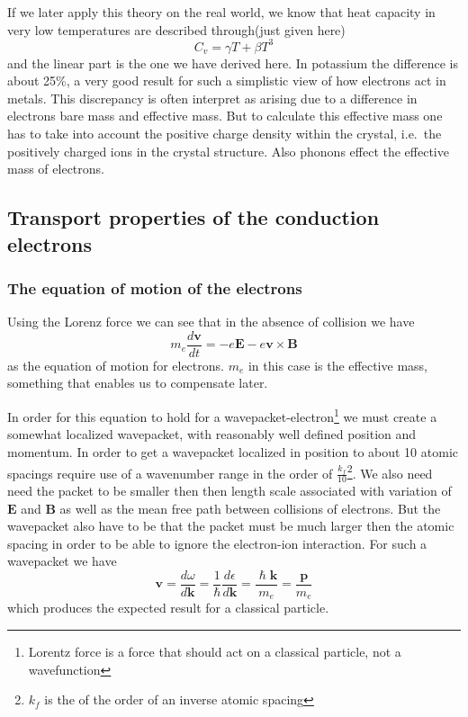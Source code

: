 \documentclass[11pt]{article}
\begin{document}
If we later apply this theory on the real world, we know that heat capacity in very low temperatures are described through(just given here)
\begin{equation}
	C_v = \gamma T + \beta T^3
\end{equation}
and the linear part is the one we have derived here. In potassium the difference is about 25\%, a very good result for such a simplistic view of how electrons act in metals. This discrepancy is often interpret as arising due to a difference in electrons bare mass and effective mass. But to calculate this effective mass one has to take into account the positive charge density within the crystal, i.e.\ the positively charged ions in the crystal structure. Also phonons effect the effective mass of electrons. 
\subsection{Transport properties of the conduction electrons}



\subsubsection{The equation of motion of the electrons}
Using the Lorenz force we can see that in the absence of collision we have
\begin{equation}
	m_e \frac{d\pmb{v}}{dt} = - e\pmb{E} - e\pmb{v} \times \pmb{B}
	\label{eq:force-electron}
\end{equation}
as the equation of motion for electrons. $m_e$ in this case is the effective mass, something that enables us to compensate later.

In order for this equation to hold for a wavepacket-electron\footnote{Lorentz force is a force that should act on a classical particle, not a wavefunction} we must create a somewhat localized wavepacket, with reasonably well defined position and momentum. In order to get a wavepacket localized in position to about 10 atomic spacings require use of a wavenumber range in the order of $\frac{k_f}{10}$\footnote{$k_f$ is the of the order of an inverse atomic spacing}. We also need need the packet to be smaller then then length scale associated with variation of $\pmb{E}$ and $\pmb{B}$ as well as the mean free path between collisions of electrons. But the wavepacket also have to be that the packet must be much larger then the atomic spacing in order to be able to ignore the electron-ion interaction. For such a wavepacket we have
\begin{equation}
	\pmb{v} = \frac{d\omega}{d \pmb{k}} = \frac{1}{\hslash} \frac{d \epsilon}{d \pmb{k}} = \frac{\hslash \pmb{k}}{m_e} = \frac{\pmb{p}}{m_e}
\end{equation}
which produces the expected result for a classical particle.
\end{document}
